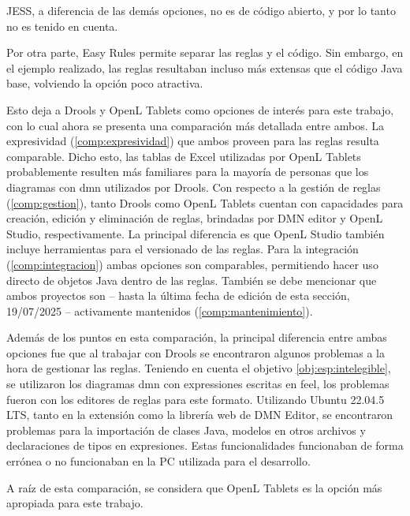 JESS, a diferencia de las demás opciones, no es de código abierto, y por lo tanto no es tenido en cuenta.

Por otra parte, Easy Rules permite separar las reglas y el código. 
Sin embargo, en el ejemplo realizado, las reglas resultaban incluso más extensas que el código Java base, volviendo la opción poco atractiva.

Esto deja a Drools y OpenL Tablets como opciones de interés para este trabajo, con lo cual ahora se presenta una comparación más detallada entre ambos. 
%
La expresividad (\cref{comp:expresividad}) que ambos proveen para las reglas resulta comparable. Dicho esto, las tablas de Excel utilizadas por OpenL Tablets probablemente resulten más familiares para la mayoría de personas que los diagramas con \acrfull{dmn} utilizados por Drools.
%
Con respecto a la gestión de reglas (\cref{comp:gestion}), tanto Drools como OpenL Tablets cuentan con capacidades para creación, edición y eliminación de reglas, brindadas por DMN editor y OpenL Studio, respectivamente. 
La principal diferencia es que OpenL Studio también incluye herramientas para el versionado de las reglas.
%
Para la integración (\cref{comp:integracion}) ambas opciones son comparables, permitiendo hacer uso directo de objetos Java dentro de las reglas.
%
También se debe mencionar que ambos proyectos son -- hasta la última fecha de edición de esta sección, 19/07/2025 -- activamente mantenidos (\cref{comp:mantenimiento}).


Además de los puntos en esta comparación, la principal diferencia entre ambas opciones fue que al trabajar con Drools se encontraron algunos problemas a la hora de gestionar las reglas. Teniendo en cuenta el objetivo \ref{obj:esp:intelegible}, se utilizaron los diagramas \acrshort{dmn} con expressiones escritas en \acrfull{feel}, los problemas fueron con los editores de reglas para este formato.
Utilizando Ubuntu 22.04.5 LTS, tanto en la extensión como la librería web de DMN Editor, se encontraron problemas para la importación de clases Java, modelos en otros archivos y declaraciones de tipos en expresiones. Estas funcionalidades funcionaban de forma errónea o no funcionaban en la PC utilizada para el desarrollo.

A raíz de esta comparación, se considera que OpenL Tablets es la opción más apropiada para este trabajo.
